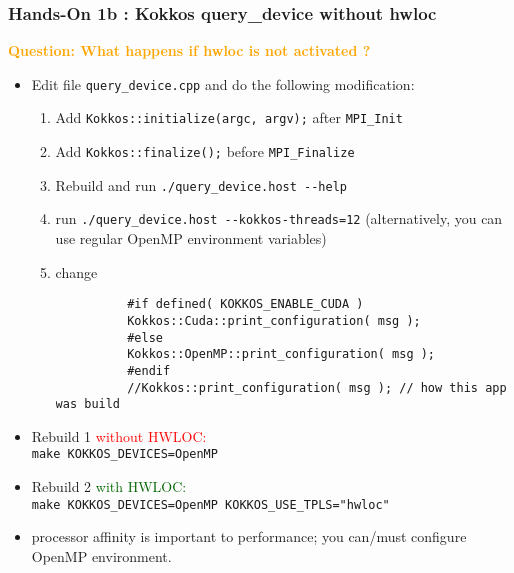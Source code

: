   
\begin{frame}[fragile=singleslide]
  \frametitle{Hands-On 1b : Kokkos query\_device without hwloc}

  {\large\textcolor{orange}{\bf Question: What happens if hwloc is not activated ?}}

  \begin{itemize}
  \item Edit file \texttt{query\_device.cpp} and do the following modification:
    \begin{enumerate}
    \item Add \texttt{Kokkos::initialize(argc, argv);} after \texttt{MPI\_Init}
    \item Add \texttt{Kokkos::finalize();} before \texttt{MPI\_Finalize}
    \item Rebuild and run \texttt{./query\_device.host \--\--help}
    \item run \texttt{./query\_device.host \--\--kokkos-threads=12} (alternatively, you can use regular OpenMP environment variables)
    \item change\\
      {\small
        \begin{verbatim}
          #if defined( KOKKOS_ENABLE_CUDA )
          Kokkos::Cuda::print_configuration( msg );
          #else
          Kokkos::OpenMP::print_configuration( msg );
          #endif
          //Kokkos::print_configuration( msg ); // how this app was build
        \end{verbatim}
      }
    \end{enumerate}
  \item {\small Rebuild 1 \textcolor{red}{without HWLOC:}\\
      \texttt{make KOKKOS\_DEVICES=OpenMP}}
  \item {\small Rebuild 2 \textcolor{darkgreen}{with HWLOC:}\\
      \texttt{make KOKKOS\_DEVICES=OpenMP KOKKOS\_USE\_TPLS="hwloc"}}
  \item processor affinity is important to performance; you can/must configure OpenMP environment.
  \end{itemize}

\end{frame}
